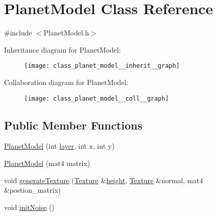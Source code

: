 \hypertarget{class_planet_model}{\section{Planet\+Model Class Reference}
\label{class_planet_model}
}


{\ttfamily \#include $<$Planet\+Model.\+h$>$}



Inheritance diagram for Planet\+Model\+:\nopagebreak
\begin{figure}[H]
\begin{center}
\leavevmode
\texttt{[image: class\_planet\_model\_\_inherit\_\_graph]}
\end{center}
\end{figure}


Collaboration diagram for Planet\+Model\+:\nopagebreak
\begin{figure}[H]
\begin{center}
\leavevmode
\texttt{[image: class\_planet\_model\_\_coll\_\_graph]}
\end{center}
\end{figure}
\subsection*{Public Member Functions}
\begin{DoxyCompactItemize}
\item 
\hyperlink{class_planet_model_aaa2a2b0dbc90840709413d285f69d44e}{Planet\+Model} (int \hyperlink{_examples_2_planet_2_app_8cpp_a821f9e41ad80528dd35e9a982db1b22a}{layer}, int x, int y)
\item 
\hyperlink{class_planet_model_a80d057db0662a584bd0ae9534cec66a9}{Planet\+Model} (mat4 matrix)
\item 
void \hyperlink{class_planet_model_ae46743410636735396db8d14e606e560}{generate\+Texture} (\hyperlink{class_agmd_1_1_texture}{Texture} \&\hyperlink{_examples_2_bezier_2_app_8cpp_a48083b65ac9a863566dc3e3fff09a5b4}{height}, \hyperlink{class_agmd_1_1_texture}{Texture} \&normal, mat4 \&postion\+\_\+matrix)
\item 
void \hyperlink{class_planet_model_ab0a4c231cea9292b1a7ea1db773b691d}{init\+Noise} ()
\end{DoxyCompactItemize}
